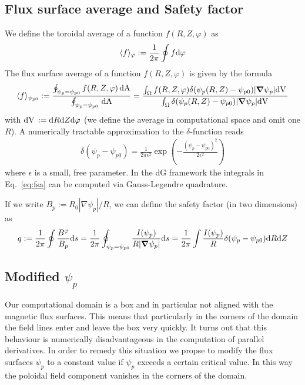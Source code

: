 \subsection{Flux surface average and Safety factor}
We define the toroidal average of a function $f(R,Z,\varphi)$ as
\begin{align} \label{eq:phi_average}
\langle f\rangle_\varphi := \frac{1}{2\pi}\oint f\mathrm{d} \varphi
\end{align}
The flux surface average
of a function $f(R,Z,\varphi)$ is given by the formula
\begin{align}\label{eq:fsa}
\langle f \rangle_{\psi_{p0}} :=
\frac{ \oint_{\psi_p = \psi_{p0} } f(R,Z,\varphi)\,\mathrm{dA}}{\oint_{\psi_p = \psi_{p0} } \,\mathrm{dA}} =
\frac{\int_\Omega f(R,Z,\varphi) \delta(\psi_p(R,Z)-\psi_{p0})|{\boldsymbol{\nabla}}\psi_p| \mathrm{dV}\,}
{\int_\Omega \delta(\psi_p(R,Z)-\psi_{p0})|{\boldsymbol{\nabla}}\psi_p|\mathrm{dV}\,}
\end{align}
with $\mathrm{dV}\, := \mathrm{d} R\mathrm{d} Z\mathrm{d} \varphi$ (we define the average in computational space and omit one $R$).
A numerically tractable approximation to the $\delta$-function reads
\begin{align}\label{eq:delta}
\delta(\psi_p-\psi_{p0}) = \frac{1}{2\pi \epsilon^2}
\exp\left( - \frac{\left(\psi_p-\psi_{p0}\right)^2}{2\epsilon^2}\right)
\end{align}
where $\epsilon$ is a small, free parameter. In the dG framework the integrals
in Eq.~\eqref{eq:fsa} can be computed via Gauss-Legendre quadrature.

If we write $B_p:=R_0|\nabla\psi_p|/R$, we can define the safety factor (in two dimensions) as
\begin{align}
q:=\frac{1}{2\pi}\oint \frac{B^\varphi}{B_p} \mathrm{d} s = \frac{1}{2\pi}\oint_{\psi_p=\psi_{p0}}\frac{I(\psi_p)}{R|{\boldsymbol{\nabla}}\psi_p|} \mathrm{d} s
= \frac{1}{2\pi}\int \frac{I(\psi_p)}{R}\delta(\psi_p-\psi_{p0}) \mathrm{d} R\mathrm{d} Z
\end{align}

\subsection{ Modified $\psi_p$}
Our computational domain is a box and in particular not aligned with the
magnetic flux surfaces. This means that particularly in the corners of
the domain the field lines enter and leave the box very quickly.
It turns out that this behaviour is numerically disadvantageous in the
computation of parallel derivatives. In order to remedy this situation
we propse to modify the flux surfaces $\psi_p$ to a constant value
if $\psi_p$ exceeds a certain critical value. In this way the poloidal
field component vanishes in the corners of the domain.

